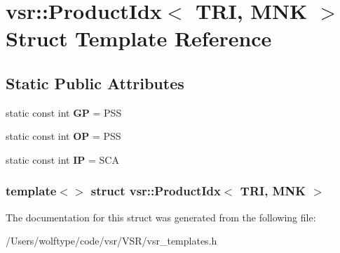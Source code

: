 \hypertarget{structvsr_1_1_product_idx_3_01_t_r_i_00_01_m_n_k_01_4}{\section{vsr\-:\-:Product\-Idx$<$ T\-R\-I, M\-N\-K $>$ Struct Template Reference}
\label{structvsr_1_1_product_idx_3_01_t_r_i_00_01_m_n_k_01_4}
}
\subsection*{Static Public Attributes}
\begin{DoxyCompactItemize}
\item 
\hypertarget{structvsr_1_1_product_idx_3_01_t_r_i_00_01_m_n_k_01_4_a2edde3a16e4213e18bc2701d8a9147a6}{static const int {\bfseries G\-P} = P\-S\-S}\label{structvsr_1_1_product_idx_3_01_t_r_i_00_01_m_n_k_01_4_a2edde3a16e4213e18bc2701d8a9147a6}

\item 
\hypertarget{structvsr_1_1_product_idx_3_01_t_r_i_00_01_m_n_k_01_4_ab2a35548d5f074dd88107695af809d1c}{static const int {\bfseries O\-P} = P\-S\-S}\label{structvsr_1_1_product_idx_3_01_t_r_i_00_01_m_n_k_01_4_ab2a35548d5f074dd88107695af809d1c}

\item 
\hypertarget{structvsr_1_1_product_idx_3_01_t_r_i_00_01_m_n_k_01_4_ae3d151598416f2f8e20e47e6975cea05}{static const int {\bfseries I\-P} = S\-C\-A}\label{structvsr_1_1_product_idx_3_01_t_r_i_00_01_m_n_k_01_4_ae3d151598416f2f8e20e47e6975cea05}

\end{DoxyCompactItemize}
\subsubsection*{template$<$$>$ struct vsr\-::\-Product\-Idx$<$ T\-R\-I, M\-N\-K $>$}



The documentation for this struct was generated from the following file\-:\begin{DoxyCompactItemize}
\item 
/\-Users/wolftype/code/vsr/\-V\-S\-R/vsr\-\_\-templates.\-h\end{DoxyCompactItemize}
